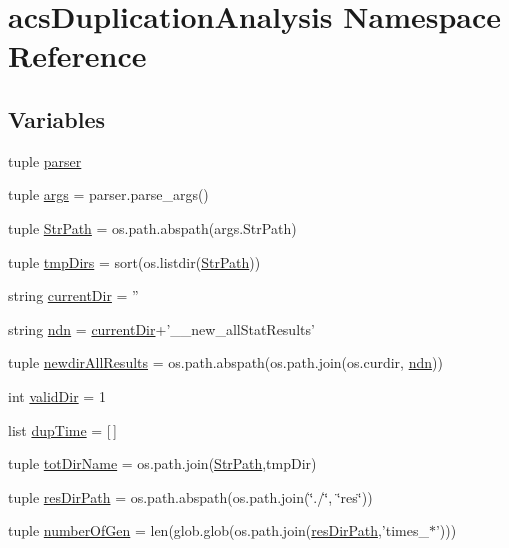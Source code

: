 \hypertarget{a00094}{\section{acs\-Duplication\-Analysis Namespace Reference}
\label{a00094}
}
\subsection*{Variables}
\begin{DoxyCompactItemize}
\item 
tuple \hyperlink{a00094_afa045b1b79e3cc0d0ff252ca426a9976}{parser}
\item 
tuple \hyperlink{a00094_a7e2e8e21468d3a77a5b5727b1db34cf5}{args} = parser.\-parse\-\_\-args()
\item 
tuple \hyperlink{a00094_aebcbc9d17a453b6b3fb1813a731ad091}{Str\-Path} = os.\-path.\-abspath(args.\-Str\-Path)
\item 
tuple \hyperlink{a00094_a5030678434c0a50876042c56b443fb93}{tmp\-Dirs} = sort(os.\-listdir(\hyperlink{a00094_aebcbc9d17a453b6b3fb1813a731ad091}{Str\-Path}))
\item 
string \hyperlink{a00094_ab5558c536d6d2eec449ad9b978bff5ab}{current\-Dir} = ''
\item 
string \hyperlink{a00094_a8f37d6ca1d77d4f1402584470a097308}{ndn} = \hyperlink{a00094_ab5558c536d6d2eec449ad9b978bff5ab}{current\-Dir}+'\-\_\-\_\-new\-\_\-all\-Stat\-Results'
\item 
tuple \hyperlink{a00094_a78f5a1cb54411a11cc368302aac35ca9}{newdir\-All\-Results} = os.\-path.\-abspath(os.\-path.\-join(os.\-curdir, \hyperlink{a00094_a8f37d6ca1d77d4f1402584470a097308}{ndn}))
\item 
int \hyperlink{a00094_a149535e505ef09d35a9ea8f4cee45b1f}{valid\-Dir} = 1
\item 
list \hyperlink{a00094_a71f19251e2a07b86d019204de83241ec}{dup\-Time} = \mbox{[}$\,$\mbox{]}
\item 
tuple \hyperlink{a00094_af2da42e1f2bbe8235624263867ef2719}{tot\-Dir\-Name} = os.\-path.\-join(\hyperlink{a00094_aebcbc9d17a453b6b3fb1813a731ad091}{Str\-Path},tmp\-Dir)
\item 
tuple \hyperlink{a00094_ace1b658a12d17a1359f37ebf927ea9b5}{res\-Dir\-Path} = os.\-path.\-abspath(os.\-path.\-join(\char`\"{}./\char`\"{}, \char`\"{}res\char`\"{}))
\item 
tuple \hyperlink{a00094_a4db9785401a572b6067cabb96b3c5ecd}{number\-Of\-Gen} = len(glob.\-glob(os.\-path.\-join(\hyperlink{a00094_ace1b658a12d17a1359f37ebf927ea9b5}{res\-Dir\-Path},'times\-\_\-$\ast$')))

\end{DoxyCompactItemize}
